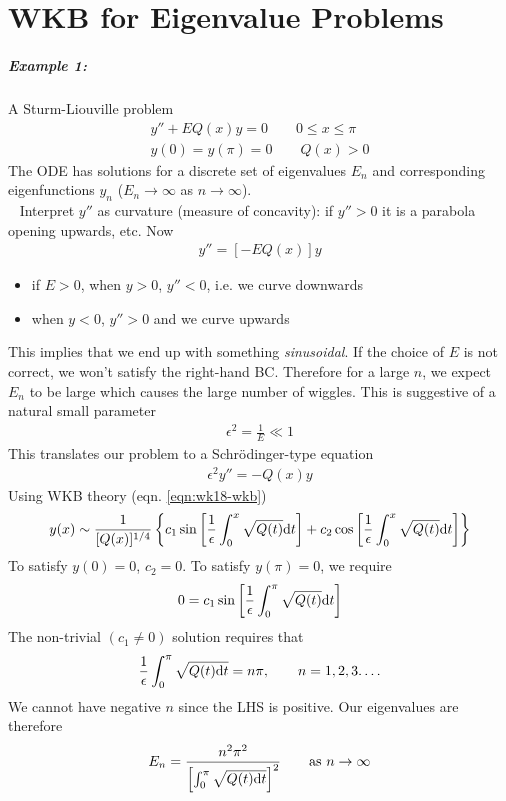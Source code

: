 \chapter{WKB for Eigenvalue Problems}

\paragraph{Example 1:} A Sturm-Liouville problem
\begin{gather*}
	y'' + E Q(x)y = 0  \qquad 0 \leq x \leq \pi   \\
	y(0) = y(\pi) = 0  \qquad Q(x) > 0
\end{gather*}
The ODE has solutions for a discrete set of eigenvalues $E_n$ and corresponding eigenfunctions $y_n$ ($E_n \rightarrow \infty$ as $n \rightarrow \infty$). \\
\ \newline
Interpret $y''$ as curvature (measure of concavity): if $y'' > 0$ it is a parabola opening upwards, etc. Now
\begin{gather*}
	y'' = [-E Q(x)] y 
\end{gather*}
\begin{itemize}
	\item if $E>0$, when $y>0$, $y'' < 0$, i.e. we curve downwards
	\item when $y<0$, $y''>0$ and we curve upwards
\end{itemize}
This implies that we end up with something \emph{sinusoidal}. If the choice of $E$ is not correct, we won't satisfy the right-hand BC. Therefore for a large $n$, we expect $E_n$ to be large which causes the large number of wiggles. This is suggestive of a natural small parameter
\begin{gather*}
	\epsilon^2 = \frac{1}{E} \ll 1
\end{gather*}
This translates our problem to a Schr\"odinger-type equation
\begin{gather*}
	\epsilon^2 y'' = -Q(x) y
\end{gather*}
Using WKB theory (eqn. \ref{eqn:wk18-wkb})
\begin{align*}
	y(x) \sim \frac{1}{[Q(x)]^{1/4}} \left\{ c_1 \sin \left[\frac{1}{\epsilon} \int_{0}^{x} \sqrt{Q(t)} \mathrm{d} t\right] + c_2 \cos \left[\frac{1}{\epsilon} \int_{0}^{x} \sqrt{Q(t)} \mathrm{d} t\right] \right\}
\end{align*}
To satisfy $y(0)=0$, $c_2=0$. To satisfy $y(\pi)=0$, we require
\begin{gather*}
	0 = c_1 \sin \left[\frac{1}{\epsilon}\int_{0}^{\pi} \sqrt{Q(t)}\mathrm{d} t\right]
\end{gather*}
The non-trivial $(c_1 \neq 0)$ solution requires that
\begin{align*}
	\frac{1}{\epsilon} \int_{0}^{\pi} \sqrt{Q(t)\mathrm{d} t} = n\pi, \qquad n = 1,2,3. \dots 
\end{align*}
We cannot have negative $n$ since the LHS is positive. Our eigenvalues are therefore
\begin{align*}
	E_n = \dfrac{n^2 \pi^2}{\left[\int_{0}^{\pi} \sqrt{Q(t)\mathrm{d} t}\right]^2} \qquad \text{as $n \rightarrow \infty$} 
\end{align*}

